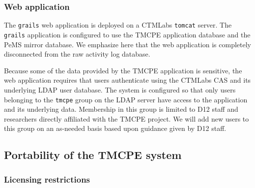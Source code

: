 \documentclass[12pt]{report}
\begin{document}
\subsubsection{Web application}
\label{sec:web-app}

The \texttt{grails} web application is deployed on a \ac{CTMLabs}
\texttt{tomcat} server.  The \texttt{grails} application is configured to use
the \ac{TMCPE} application database and the \ac{PeMS} mirror database.  We
emphasize here that the web application is completely disconnected from the raw
activity log database.  

Because some of the data provided by the \ac{TMCPE} application is sensitive,
the web application requires that users authenticate using the \ac{CTMLabs}
\acf{CAS} and its underlying \ac{LDAP} user database.  The system is configured
so that only users belonging to the \texttt{tmcpe} group on the \ac{LDAP} server
have access to the application and its underlying data.  Membership in this
group is limited to \ac{D12} staff and researchers directly affiliated with the
\ac{TMCPE} project.  We will add new users to this group on an as-needed basis
based upon guidance given by \ac{D12} staff.


\subsection{Portability of the TMCPE system}
\label{sec:portability}

\subsubsection{Licensing restrictions}
\label{sec:portability-licensing}
\end{document}
